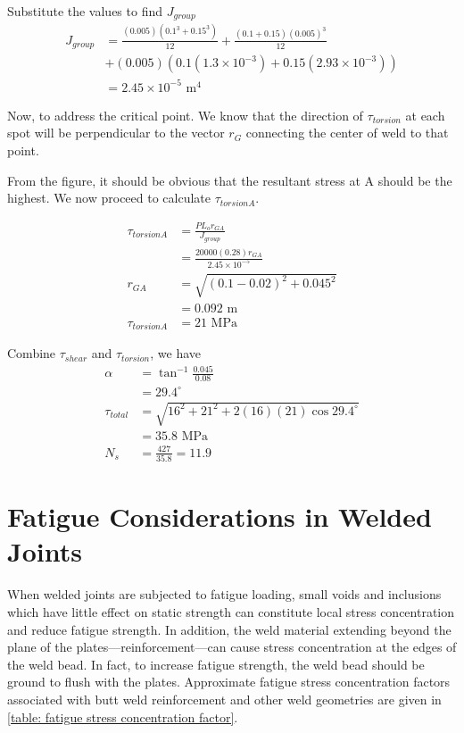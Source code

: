 \documentclass[a4paper,openany,12pt]{book}
\begin{document}
{{Substitute the values to find \(J_{group}\) $$\begin{aligned}
    J_{group} &= \frac{(0.005)(0.1^3 + 0.15^3)}{12} +\frac{(0.1 + 0.15)(0.005)^3}{12} \\
              &+ (0.005)(0.1(1.3 \times 10^{-3}) + 0.15(2.93 \times 10^{-3})) \\
              &= 2.45 \times 10^{-5} \text{ m}^4
  \end{aligned}$$

Now, to address the critical point. We know that the direction of
\(\tau_{torsion}\) at each spot will be perpendicular to the vector \(r_G\)
connecting the center of weld to that point.

From the figure, it should be obvious that the resultant stress at A
should be the highest. We now proceed to calculate \(\tau_{torsionA}\).

$$\begin{aligned}
    \tau_{torsionA} &= \frac{P L_o r_{GA}}{J_{group}} \\
                    &=\frac{20000(0.28) r_{GA}}{2.45 \times 10^{-5}} \\[1em]
    r_{GA} &= \sqrt{(0.1 - 0.02)^2 + 0.045^2} \\
                    &= 0.092 \text{ m} \\[1em]
    \tau_{torsionA} &= 21 \text{ MPa}
  \end{aligned}$$

Combine \(\tau_{shear}\) and \(\tau_{torsion}\), we have $$\begin{aligned}
    \alpha &= \tan^{-1} \frac{0.045}{0.08} \\
           &= 29.4^{\circ} \\[1em]
    \tau_{total} &= \sqrt{ 16^2 + 21^2 + 2(16)(21) \cos 29.4^{\circ} } \\
           &= 35.8 \text{ MPa} \\[1em]
    N_s &= \frac{427}{35.8} = 11.9
  \end{aligned}$$

\section{Fatigue Considerations in Welded Joints}
\label{fatigue-considerations-in-welded-joints}
When welded joints are subjected to fatigue loading, small voids and
inclusions which have little effect on static strength can constitute
local stress concentration and reduce fatigue strength. In addition, the
weld material extending beyond the plane of the
plates---reinforcement---can cause stress concentration at the edges of
the weld bead. In fact, to increase fatigue strength, the weld bead
should be ground to flush with the plates. Approximate fatigue stress
concentration factors associated with butt weld reinforcement and other
weld geometries are given in
\ref{table: fatigue stress concentration factor}.


}}
\end{document}
